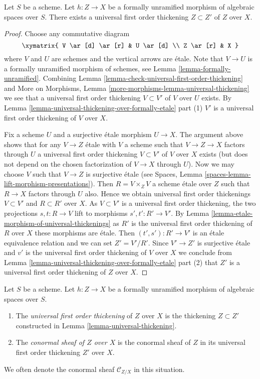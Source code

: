 \begin{lemma}
\label{lemma-universal-thickening}
Let $S$ be a scheme.
Let $h : Z \to X$ be a formally unramified morphism of algebraic
spaces over $S$.
There exists a universal first order thickening $Z \subset Z'$ of
$Z$ over $X$.
\end{lemma}

\begin{proof}
Choose any commutative diagram
$$
\xymatrix{
V \ar[d] \ar[r] & U \ar[d] \\
Z \ar[r] & X
}
$$
where $V$ and $U$ are schemes and the vertical arrows are \'etale.
Note that $V \to U$ is a formally unramified morphism of schemes, see
Lemma \ref{lemma-formally-unramified}.
Combining
Lemma \ref{lemma-check-universal-first-order-thickening}
and
More on Morphisms, Lemma \ref{more-morphisms-lemma-universal-thickening}
we see that a universal first order thickening $V \subset V'$
of $V$ over $U$ exists. By
Lemma \ref{lemma-universal-thickening-over-formally-etale} part (1)
$V'$ is a universal first order thickening of $V$ over $X$.

\medskip\noindent
Fix a scheme $U$ and a surjective \'etale morphism $U \to X$.
The argument above shows that for any $V \to Z$ \'etale with $V$
a scheme such that $V \to Z \to X$ factors through $U$ a
universal first order thickening $V \subset V'$ of $V$ over $X$
exists (but does not depend on the chosen factorization of $V \to X$
through $U$). Now we may choose $V$ such that $V \to Z$ is surjective
\'etale (see
Spaces, Lemma \ref{spaces-lemma-lift-morphism-presentations}).
Then $R = V \times_Z V$ a scheme \'etale over $Z$ such that
$R \to X$ factors through $U$ also.
Hence we obtain universal first order thickenings
$V \subset V'$ and $R \subset R'$ over $X$.
As $V \subset V'$ is a universal first order thickening,
the two projections $s, t : R \to V$ lift to morphisms
$s', t': R' \to V'$. By
Lemma \ref{lemma-etale-morphism-of-universal-thickenings}
as $R'$ is the universal first order thickening of $R$ over $X$
these morphisms are \'etale.
Then $(t', s') : R' \to V'$ is an \'etale equivalence relation
and we can set $Z' = V'/R'$. Since $V' \to Z'$ is surjective \'etale
and $v'$ is the universal first order thickening of $V$ over $X$
we conclude from
Lemma \ref{lemma-universal-thickening-over-formally-etale} part (2)
that $Z'$ is a universal first order thickening of $Z$ over $X$.
\end{proof}

\begin{definition}
\label{definition-universal-thickening}
Let $S$ be a scheme.
Let $h : Z \to X$ be a formally unramified morphism of
algebraic spaces over $S$.
\begin{enumerate}
\item The {\it universal first order thickening} of $Z$ over $X$
is the thickening $Z \subset Z'$ constructed in
Lemma \ref{lemma-universal-thickening}.
\item The {\it conormal sheaf of $Z$ over $X$} is the conormal sheaf
of $Z$ in its universal first order thickening $Z'$ over $X$.
\end{enumerate}
We often denote the conormal sheaf $\mathcal{C}_{Z/X}$ in this situation.
\end{definition}

